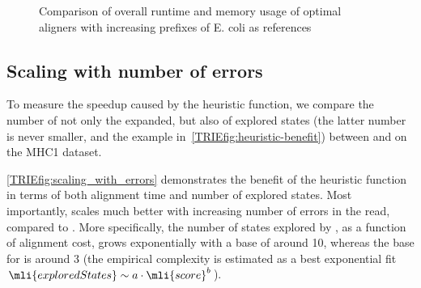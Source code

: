\begin{figure}[t]
  \caption[Performance scaling with reference size]{Comparison of overall
     runtime and memory usage of optimal aligners with increasing prefixes of E.
     coli as references}
  \label{TRIEfig:scaling_with_graphsize}
\end{figure}

\subsection{Scaling with number of errors}
To measure the speedup caused by the heuristic function, we compare the number
of not only the expanded, but also of explored states (the latter number is
never smaller, and the example in~\cref{TRIEfig:heuristic-benefit}) between
\astarix and \dijkstra on the MHC1 dataset.

\cref{TRIEfig:scaling_with_errors} demonstrates the benefit of the heuristic
function in terms of both alignment time and number of explored states. Most
importantly, \astarix scales much better with increasing number of errors in the
read, compared to \dijkstra. More specifically, the number of states explored by
\dijkstra, as a function of alignment cost, grows exponentially with a base of 
around 10, whereas the base for \astarix is around 3 (the empirical complexity is
estimated as a best exponential fit \mbox{$\mli{exploredStates} \sim a \cdot
\mli{score}^b$}).

